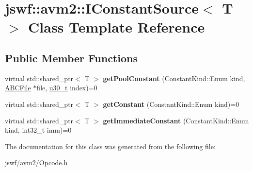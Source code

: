 \hypertarget{classjswf_1_1avm2_1_1_i_constant_source}{\section{jswf\+:\+:avm2\+:\+:I\+Constant\+Source$<$ T $>$ Class Template Reference}
\label{classjswf_1_1avm2_1_1_i_constant_source}
}
\subsection*{Public Member Functions}
\begin{DoxyCompactItemize}
\item 
\hypertarget{classjswf_1_1avm2_1_1_i_constant_source_a32505ebb896dbfcdca660187f2cc95c9}{virtual std\+::shared\+\_\+ptr$<$ T $>$ {\bfseries get\+Pool\+Constant} (Constant\+Kind\+::\+Enum kind, \hyperlink{classjswf_1_1avm2_1_1_a_b_c_file}{A\+B\+C\+File} $\ast$file, \hyperlink{namespacejswf_aa10d9ddca2a6a5debdc261dfae3d1117}{u30\+\_\+t} index)=0}\label{classjswf_1_1avm2_1_1_i_constant_source_a32505ebb896dbfcdca660187f2cc95c9}

\item 
\hypertarget{classjswf_1_1avm2_1_1_i_constant_source_abd4ab71644db29813b51f627c5259528}{virtual std\+::shared\+\_\+ptr$<$ T $>$ {\bfseries get\+Constant} (Constant\+Kind\+::\+Enum kind)=0}\label{classjswf_1_1avm2_1_1_i_constant_source_abd4ab71644db29813b51f627c5259528}

\item 
\hypertarget{classjswf_1_1avm2_1_1_i_constant_source_a99da62daf2d81a529f2127a3c9cfedf1}{virtual std\+::shared\+\_\+ptr$<$ T $>$ {\bfseries get\+Immediate\+Constant} (Constant\+Kind\+::\+Enum kind, int32\+\_\+t imm)=0}\label{classjswf_1_1avm2_1_1_i_constant_source_a99da62daf2d81a529f2127a3c9cfedf1}

\end{DoxyCompactItemize}


The documentation for this class was generated from the following file\+:\begin{DoxyCompactItemize}
\item 
jswf/avm2/Opcode.\+h\end{DoxyCompactItemize}
